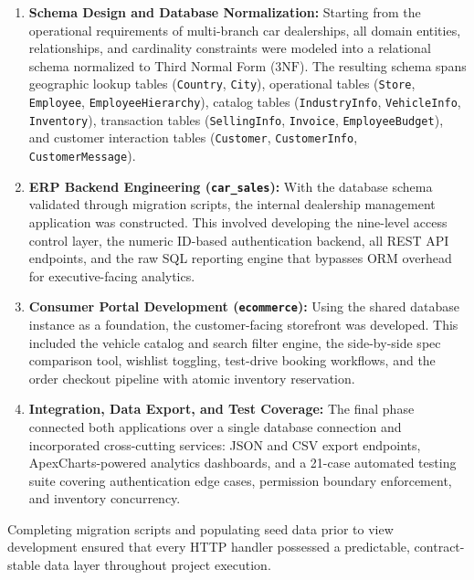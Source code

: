 \begin{enumerate}
    \item \textbf{Schema Design and Database Normalization:} Starting from the operational requirements of multi-branch car dealerships, all domain entities, relationships, and cardinality constraints were modeled into a relational schema normalized to Third Normal Form ($3\text{NF}$). The resulting schema spans geographic lookup tables (\texttt{Country}, \texttt{City}), operational tables (\texttt{Store}, \texttt{Employee}, \texttt{Employee}\allowbreak\texttt{Hierarchy}), catalog tables (\texttt{Industry}\allowbreak\texttt{Info}, \texttt{Vehicle}\allowbreak\texttt{Info}, \texttt{Inventory}), transaction tables (\texttt{Selling}\allowbreak\texttt{Info}, \texttt{Invoice}, \texttt{Employee}\allowbreak\texttt{Budget}), and customer interaction tables (\texttt{Customer}, \texttt{Customer}\allowbreak\texttt{Info}, \texttt{Customer}\allowbreak\texttt{Message}).
    \item \textbf{ERP Backend Engineering (\texttt{car\_sales}):} With the database schema validated through migration scripts, the internal dealership management application was constructed. This involved developing the nine-level access control layer, the numeric ID-based authentication backend, all REST API endpoints, and the raw SQL reporting engine that bypasses ORM overhead for executive-facing analytics.
    \item \textbf{Consumer Portal Development (\texttt{ecommerce}):} Using the shared database instance as a foundation, the customer-facing storefront was developed. This included the vehicle catalog and search filter engine, the side-by-side spec comparison tool, wishlist toggling, test-drive booking workflows, and the order checkout pipeline with atomic inventory reservation.
    \item \textbf{Integration, Data Export, and Test Coverage:} The final phase connected both applications over a single database connection and incorporated cross-cutting services: JSON and CSV export endpoints, ApexCharts-powered analytics dashboards, and a 21-case automated testing suite covering authentication edge cases, permission boundary enforcement, and inventory concurrency.
\end{enumerate}

Completing migration scripts and populating seed data prior to view development ensured that every HTTP handler possessed a predictable, contract-stable data layer throughout project execution.

